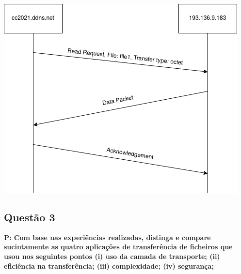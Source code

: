 \documentclass[a4paper]{article}
\begin{document}
\begin{center}
	\includegraphics[scale=0.5]{images/diagramaTFTP}
\end{center}


\vspace{8ex}

	\subsection{ Questão 3}
\textbf{P: Com base nas experiências realizadas, distinga e compare sucintamente as quatro aplicações de transferência de ficheiros que usou nos seguintes pontos (i) uso da camada de transporte; (ii) eficiência na transferência; (iii) complexidade; (iv) segurança;\\}
\end{document}
